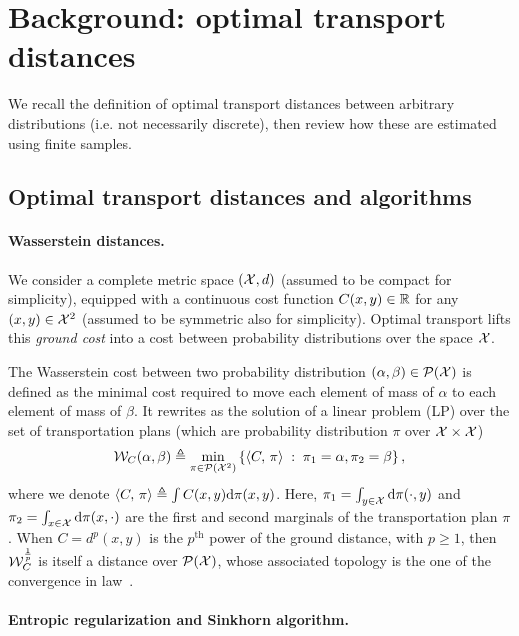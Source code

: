 \section{Background: optimal transport distances}

We recall the definition of optimal transport distances between arbitrary distributions (i.e. not necessarily discrete), then review how these are estimated using finite samples.

\subsection{Optimal transport distances and algorithms}

\paragraph{Wasserstein distances.} 

We consider a complete metric space $(\mathcal{X},d)$ (assumed to be compact for simplicity), equipped
with a continuous cost function $C(x,y) \in \mathbb{R}$ for any $(x,y) \in \mathcal{X}^2$ (assumed to be symmetric also for simplicity). 
%
Optimal transport lifts this \textit{ground cost} into a cost between probability
distributions over the space $\mathcal{X}$. 
%

The Wasserstein cost between two probability distribution $(\alpha, \beta) \in \mathcal{P}(\mathcal{X})$ is defined as the minimal cost required to move each element of mass of $\alpha$ to each element of mass of $\beta$. It rewrites as the solution of a
linear problem (LP) over the set of transportation plans (which are probability distribution $\pi$ over $\mathcal{X} \times \mathcal{X}$)
\begin{equation}\label{eq:wass}
    \mathcal{W}_C(\alpha, \beta) \triangleq 
    \min_{\pi \in \mathcal{P}(\mathcal{X}^2)}
    \left\{ 
    	\langle C,\,\pi\rangle
	 \;:\;  \pi_1=\alpha, \pi_2=\beta \right\},
\end{equation}
where we denote $\langle C,\,\pi\rangle \triangleq \int C(x,y) \textrm{d}\pi(x,y)$. Here,  
$\pi_1 = \int_{y\in \mathcal{X}} \textrm{d} \pi(\cdot, y)$ and $\pi_2 = \int_{x\in \mathcal{X}} \textrm{d}
\pi(x, \cdot)$ are the first and second marginals of the transportation plan $\pi$. 
%
When $C=d^p(x,y)$ is the $p^{\text{th}}$ power of the ground distance, with $p \geq 1$, then $\mathcal{W}_C^{\frac{1}{p}}$ is itself a distance over $\mathcal{P}(\mathcal{X})$, whose associated topology is the one of the convergence in law~\cite{santambrogio2015optimal}.

\paragraph{Entropic regularization and Sinkhorn algorithm.} 

